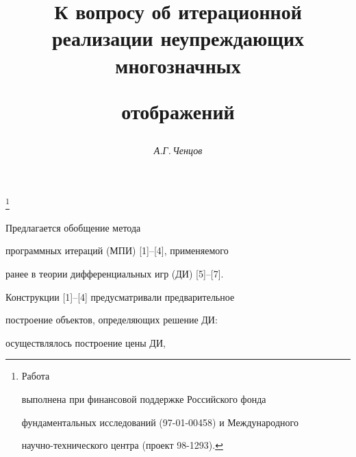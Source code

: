  


\setcounter{page}{66} 












 


\author{\it А.Г.\,Ченцов} 




\title{К вопросу об итерационной реализации неупреждающих многозначных


отображений}


\thanks{Работа


выполнена при финансовой поддержке Российского фонда


фундаментальных исследований (97-01-00458) и Международного


научно-технического центра (проект 98-1293).}


 


\date{} 




\pagestyle{plain} %


 




\maketitle 


\label{begin} 


 


Предлагается обобщение метода


программных итераций (МПИ) [1]--[4], применяемого


ранее в теории дифференциальных игр (ДИ) [5]--[7].


Конструкции [1]--[4] предусматривали предварительное


построение объектов, определяющих решение ДИ:


осуществлялось построение цены ДИ,


